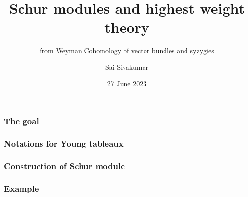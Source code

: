 \documentclass[mathserif]{beamer}
\title{Schur modules and highest weight theory}
\subtitle{from Weyman Cohomology of vector bundles and syzygies}
\author[Sai Sivakumar]{Sai Sivakumar}
\date{27 June 2023}
\begin{document}
\frame{\titlepage}

\begin{frame}
    \frametitle{The goal}

    

\end{frame}

\begin{frame}
    \frametitle{Notations for Young tableaux}

    

\end{frame}

\begin{frame}
    \frametitle{Construction of Schur module}

    

\end{frame}

\begin{frame}

    

\end{frame}

\begin{frame}

    

\end{frame}

\begin{frame}

    

\end{frame}

\begin{frame}
    \frametitle{Example}

    

\end{frame}

\begin{frame}

    

\end{frame}

\begin{frame}

    

\end{frame}
\end{document}
